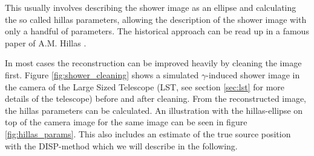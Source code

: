 This usually involves describing the 
shower image as an ellipse and calculating the so called hillas parameters,
allowing the description of the shower image with only a handful of parameters.
The historical approach can be read up in 
a famous paper of A.M. Hillas \cite{hillas_params}.

In most cases the reconstruction can be improved heavily by cleaning the image first.
Figure \ref{fig:shower_cleaning} shows a simulated $\gamma$-induced shower image
in the camera of the Large Sized Telescope (LST, see section \ref{sec:lst} for more details of the telescope)
before and after cleaning.
From the reconstructed image, the hillas parameters can be calculated.
An illustration with the hillas-ellipse on top of the camera image 
for the same image can be seen in figure \ref{fig:hillas_params}.
This also includes an estimate of the true source position with the DISP-method
which we will describe in the following.

